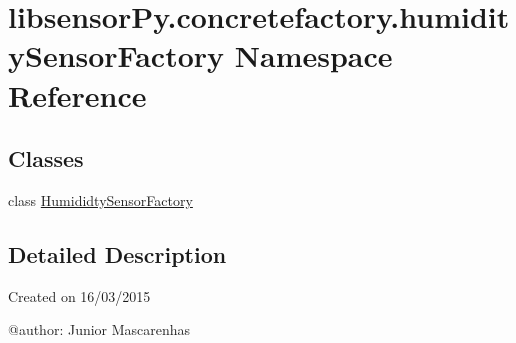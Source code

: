 \hypertarget{namespacelibsensorPy_1_1concretefactory_1_1humiditySensorFactory}{}\section{libsensor\+Py.\+concretefactory.\+humidity\+Sensor\+Factory Namespace Reference}
\label{namespacelibsensorPy_1_1concretefactory_1_1humiditySensorFactory}
\subsection*{Classes}
\begin{DoxyCompactItemize}
\item 
class \hyperlink{classlibsensorPy_1_1concretefactory_1_1humiditySensorFactory_1_1HumididtySensorFactory}{Humididty\+Sensor\+Factory}
\end{DoxyCompactItemize}


\subsection{Detailed Description}
\begin{DoxyVerb}Created on 16/03/2015

@author: Junior Mascarenhas
\end{DoxyVerb}
 